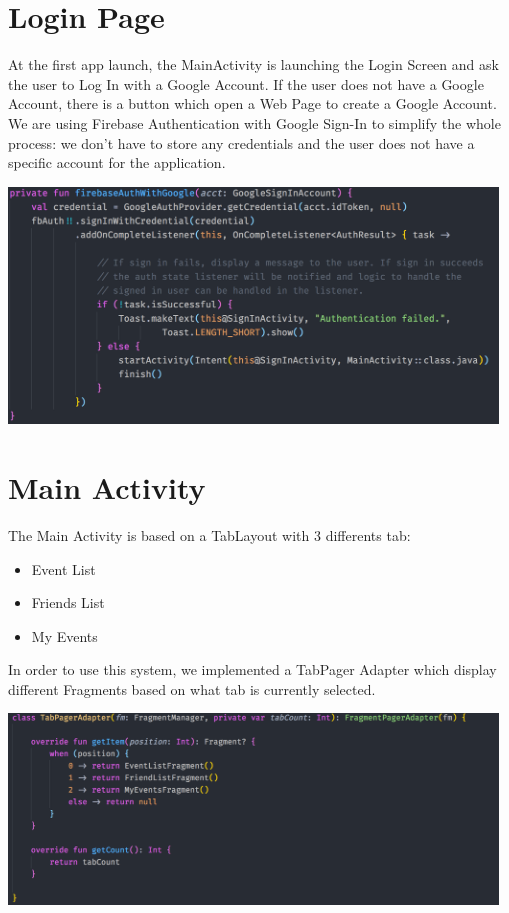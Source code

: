 \documentclass[a4paper,11pt, oneside]{book}
\begin{document}
		\section{Login Page}
		
		At the first app launch, the MainActivity is launching the Login Screen and ask the user 
		to Log In with a Google Account. If the user does not have a Google Account, there is a button 
		which open a Web Page to create a Google Account. We are using Firebase Authentication with Google Sign-In
		to simplify the whole process: we don't have to store any credentials and the user does not have a specific account
		for the application.

		\includegraphics[width=13cm]{./img/firebaseauth.png}

	\section{Main Activity}

	The Main Activity is based on a TabLayout with 3 differents tab: 
	\begin{itemize}
		\item Event List
		\item Friends List
		\item My Events
	\end{itemize}
		In order to use this system, we implemented a TabPager Adapter which display different Fragments based on 
		what tab is currently selected.
		
		\includegraphics[width=13cm]{./img/tabpager.png}
\end{document}
